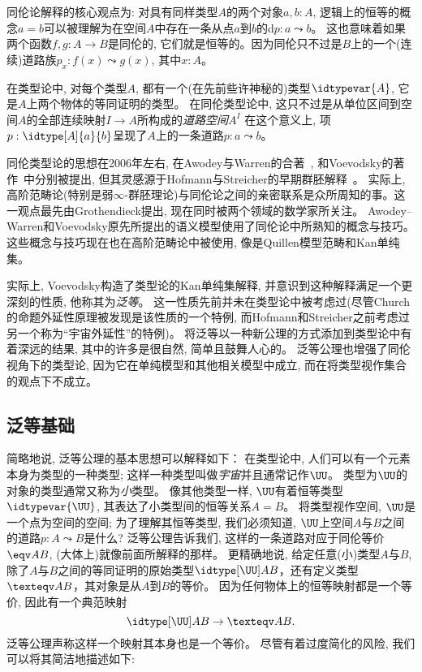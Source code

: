 同伦论解释的核心观点为: 对具有同样类型$A$的两个对象$a, b:A$,  逻辑上的恒等的概念$a=b$可以被理解为在空间$A$中存在一条从点$a$到$b$的d$p : a \leadsto b$。
这也意味着如果两个函数$f, g: A \to B$是同伦的, 它们就是恒等的。因为同伦只不过是$B$上的一个(连续)道路族$p_x: f(x) \leadsto g(x)$, 其中$x:A$。

在类型论中, 对每个类型$A$, 都有一个(在先前些许神秘的)类型$\idtypevar{A}$, 它是$A$上两个物体的等同证明的类型。
在同伦类型论中, 这只不过是从单位区间到空间$A$的全部连续映射$I \to A$所构成的\emph{道路空间}$A^I$
%
%
%
%
在这个意义上, 项$p : \idtype[A]{a}{b}$呈现了$A$上的一条道路$p : a \leadsto b$。

同伦类型论的思想在2006年左右, 在Awodey与Warren的合著~\cite{AW}, 和Voevodsky的著作~\cite{VV}中分别被提出,  
但其灵感源于Hofmann与Streicher的早期群胚解释~\cite{hs:gpd-typethy}。
实际上, 高阶范畴论(特别是弱$\infty$-群胚理论)与同伦论之间的亲密联系是众所周知的事。这一观点最先由Grothendieck提出, 现在同时被两个领域的数学家所关注。
Awodey--Warren和Voevodsky原先所提出的语义模型使用了同伦论中所熟知的概念与技巧。这些概念与技巧现在也在高阶范畴论中被使用, 
像是Quillen模型范畴和Kan单纯集。
%
%

实际上, Voevodsky构造了类型论的Kan单纯集解释, 并意识到这种解释满足一个更深刻的性质, 他称其为\emph{泛等}。
这一性质先前并未在类型论中被考虑过(尽管Church的命题外延性原理被发现是该性质的一个特例, 而Hofmann和Streicher之前考虑过另一个称为``宇宙外延性''的特例)。
将泛等以一种新公理的方式添加到类型论中有着深远的结果, 其中的许多是很自然, 简单且鼓舞人心的。
泛等公理也增强了同伦视角下的类型论, 因为它在单纯模型和其他相关模型中成立, 而在将类型视作集合的观点下不成立。

\subsection*{泛等基础}

简略地说, 泛等公理的基本思想可以解释如下：
在类型论中, 人们可以有一个元素本身为类型的一种类型; 这样一种类型叫做\emph{宇宙}并且通常记作$\UU$。
类型为$\UU$的对象的类型通常又称为\emph{小}类型。
%
%
像其他类型一样, $\UU$有着恒等类型$\idtypevar{\UU}$, 其表达了小类型间的恒等关系$A=B$。
将类型视作空间, $\UU$是一个点为空间的空间; 为了理解其恒等类型, 我们必须知道, $\UU$上空间$A$与$B$之间的道路$p: A \leadsto B$是什么?
泛等公理告诉我们, 这样的一条道路对应于同伦等价$\eqv A B$,  (大体上)就像前面所解释的那样。
更精确地说, 给定任意(小)类型$A$与$B$, 除了$A$与$B$之间的等同证明的原始类型$\idtype[\UU]AB$，还有定义类型$\texteqv AB$，其对象是从$A$到$B$的等价。
因为任何物体上的恒等映射都是一个等价, 因此有一个典范映射
\[\idtype[\UU]AB\to\texteqv AB.\]
泛等公理声称这样一个映射其本身也是一个等价。
尽管有着过度简化的风险, 我们可以将其简洁地描述如下:

